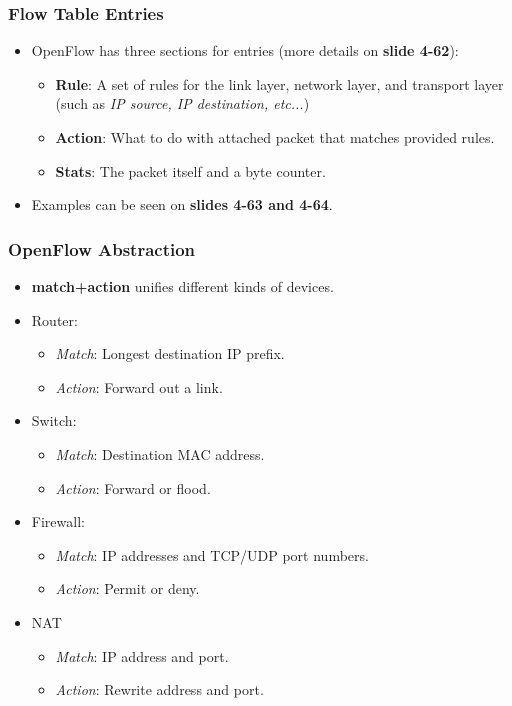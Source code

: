 \documentclass{article}
\begin{document}
\subsubsection{Flow Table Entries}
\begin{itemize}
\item OpenFlow has three sections for entries (more details on {\bf slide 4-62}):
\begin{itemize}
\item {\bf Rule}: A set of rules for the link layer, network layer, and transport layer (such as \emph{IP source, IP destination, etc...})
\item {\bf Action}: What to do with attached packet that matches provided rules.
\item {\bf Stats}: The packet itself and a byte counter.
\end{itemize}
\item Examples can be seen on {\bf slides 4-63 and 4-64}.
\end{itemize}

\subsubsection{OpenFlow Abstraction}
\begin{itemize}
\item {\bf match+action} unifies different kinds of devices.
\item Router:
\begin{itemize}
\item \emph{Match}: Longest destination IP prefix.
\item \emph{Action}: Forward out a link.
\end{itemize}
\item Switch:
\begin{itemize}
\item \emph{Match}: Destination MAC address.
\item \emph{Action}: Forward or flood.
\end{itemize}
\item Firewall:
\begin{itemize}
\item \emph{Match}: IP addresses and TCP/UDP port numbers.
\item \emph{Action}: Permit or deny.
\end{itemize}
\item NAT
\begin{itemize}
\item \emph{Match}: IP address and port.
\item \emph{Action}: Rewrite address and port.
\end{itemize}
\end{itemize}
\end{document}
